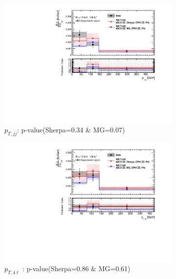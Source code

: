 \begin{figure}[!htb]
\begin{subfigure}{.49\textwidth}
        \centering
        \includegraphics[width=.98\linewidth]{figures/Results/CrossSection_VBSSuppressed/xs_ptjj_CR.pdf}
        \caption{ \footnotesize{$p_{T,jj}$}: p-value(Sherpa=0.34 $\&$ MG=0.07)}
    \end{subfigure}
    \begin{subfigure}{.49\textwidth}
        \centering
        \includegraphics[width=.98\linewidth]{figures/Results/CrossSection_VBSSuppressed/xs_pt4l_CR.pdf}
        \caption{ \footnotesize{$p_{T,4\ell}$ }: p-value(Sherpa=0.86 $\&$ MG=0.61)}
    \end{subfigure}\\
    \begin{subfigure}{.49\textwidth}
        \centering

\end{subfigure}
\end{figure}
